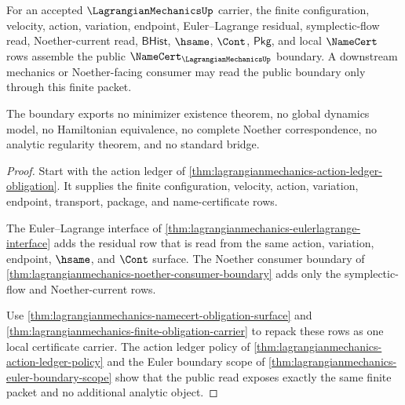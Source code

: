 \begin{theorem}
\label{thm:lagrangianmechanics-public-namecert-boundary}
For an accepted $\LagrangianMechanicsUp$ carrier, the finite configuration,
velocity, action, variation, endpoint, Euler--Lagrange residual,
symplectic-flow read, Noether-current read, $\mathsf{BHist}$, $\hsame$,
$\Cont$, $\mathsf{Pkg}$, and local $\NameCert$ rows assemble the public
$\NameCert_{\LagrangianMechanicsUp}$ boundary. A downstream mechanics or
Noether-facing consumer may read the public boundary only through this finite
packet.

The boundary exports no minimizer existence theorem, no global dynamics model,
no Hamiltonian equivalence, no complete Noether correspondence, no analytic
regularity theorem, and no standard bridge.
\end{theorem}
\begin{proof}
Start with the action ledger of
\autoref{thm:lagrangianmechanics-action-ledger-obligation}. It supplies the
finite configuration, velocity, action, variation, endpoint, transport,
package, and name-certificate rows.

The Euler--Lagrange interface of
\autoref{thm:lagrangianmechanics-eulerlagrange-interface} adds the residual row
that is read from the same action, variation, endpoint, $\hsame$, and $\Cont$
surface. The Noether consumer boundary of
\autoref{thm:lagrangianmechanics-noether-consumer-boundary} adds only the
symplectic-flow and Noether-current rows.

Use \autoref{thm:lagrangianmechanics-namecert-obligation-surface} and
\autoref{thm:lagrangianmechanics-finite-obligation-carrier} to repack these
rows as one local certificate carrier. The action ledger policy of
\autoref{thm:lagrangianmechanics-action-ledger-policy} and the Euler boundary
scope of \autoref{thm:lagrangianmechanics-euler-boundary-scope} show that the
public read exposes exactly the same finite packet and no additional analytic
object.
\end{proof}

